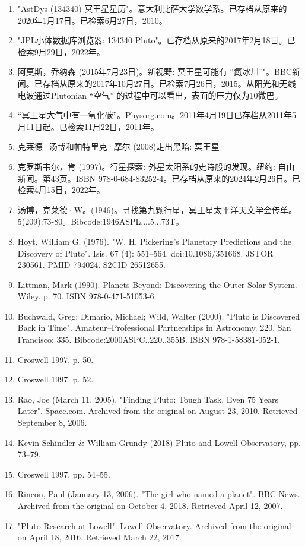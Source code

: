 \begin{enumerate}
\item "AstDys (134340) 冥王星星历"。意大利比萨大学数学系。已存档从原来的2020年1月17日。已检索6月27日，2010。
\item "JPL小体数据库浏览器: 134340 Pluto"。已存档从原来的2017年2月18日。已检索9月29日，2022年。
\item 阿莫斯，乔纳森 (2015年7月23日)。新视野: 冥王星可能有 “氮冰川”"。BBC新闻。已存档从原来的2017年10月27日。已检索7月26日，2015。从阳光和无线电波通过Plutonian “空气” 的过程中可以看出，表面的压力仅为10微巴。
\item “冥王星大气中有一氧化碳”。Physorg.com。2011年4月19日已存档从2011年5月11日起。已检索11月22日，2011年。
\item 克莱德·汤博和帕特里克·摩尔 (2008)走出黑暗: 冥王星
\item 克罗斯韦尔，肯 (1997)。行星探索: 外星太阳系的史诗般的发现。纽约: 自由新闻。第43页。ISBN 978-0-684-83252-4。已存档从原来的2024年2月26日。已检索4月15日，2022年。
\item 汤博，克莱德·W。(1946)。寻找第九颗行星，冥王星太平洋天文学会传单。5(209):73-80。Bibcode:1946ASPL....5...73T。
\item Hoyt, William G. (1976). "W. H. Pickering's Planetary Predictions and the Discovery of Pluto". Isis. 67 (4): 551–564. doi:10.1086/351668. JSTOR 230561. PMID 794024. S2CID 26512655.
\item Littman, Mark (1990). Planets Beyond: Discovering the Outer Solar System. Wiley. p. 70. ISBN 978-0-471-51053-6.
\item Buchwald, Greg; Dimario, Michael; Wild, Walter (2000). "Pluto is Discovered Back in Time". Amateur–Professional Partnerships in Astronomy. 220. San Francisco: 335. Bibcode:2000ASPC..220..355B. ISBN 978-1-58381-052-1.
\item Croswell 1997, p. 50.
\item Croswell 1997, p. 52.
\item Rao, Joe (March 11, 2005). "Finding Pluto: Tough Task, Even 75 Years Later". Space.com. Archived from the original on August 23, 2010. Retrieved September 8, 2006.
\item Kevin Schindler & William Grundy (2018) Pluto and Lowell Observatory, pp. 73–79.
\item Croswell 1997, pp. 54–55.
\item Rincon, Paul (January 13, 2006). "The girl who named a planet". BBC News. Archived from the original on October 4, 2018. Retrieved April 12, 2007.
\item "Pluto Research at Lowell". Lowell Observatory. Archived from the original on April 18, 2016. Retrieved March 22, 2017.

\end{enumerate}
